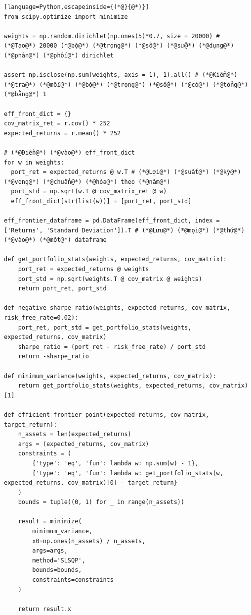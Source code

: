 \begin{lstlisting}[language=Python,escapeinside={(*@}{@*)}]
from scipy.optimize import minimize

weights = np.random.dirichlet(np.ones(5)*0.7, size = 20000) # (*@Tạo@*) 20000 (*@bộ@*) (*@trọng@*) (*@số@*) (*@sử@*) (*@dụng@*) (*@phân@*) (*@phối@*) dirichlet

assert np.isclose(np.sum(weights, axis = 1), 1).all() # (*@Kiểm@*) (*@tra@*) (*@mỗi@*) (*@bộ@*) (*@trọng@*) (*@số@*) (*@có@*) (*@tổng@*) (*@bằng@*) 1

eff_front_dict = {}
cov_matrix_ret = r.cov() * 252
expected_returns = r.mean() * 252

# (*@Điền@*) (*@vào@*) eff_front_dict
for w in weights:
  port_ret = expected_returns @ w.T # (*@Lợi@*) (*@suất@*) (*@kỳ@*) (*@vọng@*) (*@chuẩn@*) (*@hóa@*) theo (*@năm@*)
  port_std = np.sqrt(w.T @ cov_matrix_ret @ w)
  eff_front_dict[str(list(w))] = [port_ret, port_std]

eff_frontier_dataframe = pd.DataFrame(eff_front_dict, index = ['Returns', 'Standard Deviation']).T # (*@Lưu@*) (*@mọi@*) (*@thứ@*) (*@vào@*) (*@một@*) dataframe

def get_portfolio_stats(weights, expected_returns, cov_matrix):
    port_ret = expected_returns @ weights
    port_std = np.sqrt(weights.T @ cov_matrix @ weights)
    return port_ret, port_std

def negative_sharpe_ratio(weights, expected_returns, cov_matrix, risk_free_rate=0.02):
    port_ret, port_std = get_portfolio_stats(weights, expected_returns, cov_matrix)
    sharpe_ratio = (port_ret - risk_free_rate) / port_std
    return -sharpe_ratio

def minimum_variance(weights, expected_returns, cov_matrix):
    return get_portfolio_stats(weights, expected_returns, cov_matrix)[1]

def efficient_frontier_point(expected_returns, cov_matrix, target_return):
    n_assets = len(expected_returns)
    args = (expected_returns, cov_matrix)
    constraints = (
        {'type': 'eq', 'fun': lambda w: np.sum(w) - 1},
        {'type': 'eq', 'fun': lambda w: get_portfolio_stats(w, expected_returns, cov_matrix)[0] - target_return}
    )
    bounds = tuple((0, 1) for _ in range(n_assets))

    result = minimize(
        minimum_variance,
        x0=np.ones(n_assets) / n_assets,
        args=args,
        method='SLSQP',
        bounds=bounds,
        constraints=constraints
    )

    return result.x


\end{lstlisting}
